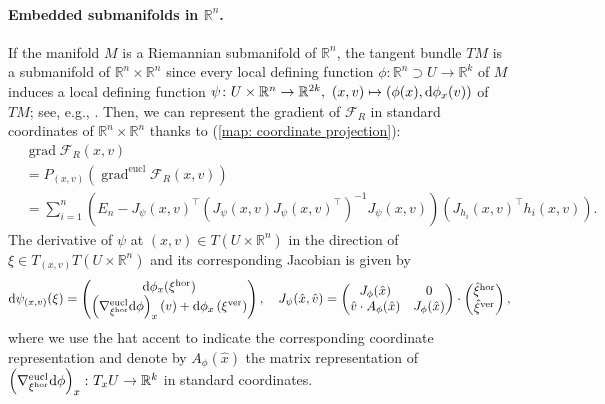 \documentclass[11pt,a4paper]{article}
\theoremstyle{plain}
\theoremstyle{definition}
\newcommand{\RR}{\mathbb{R}}
\DeclareMathOperator{\grad}{grad}
\newcommand{\hor}{\operatorname{hor}}
\newcommand{\ver}{\operatorname{ver}}
\newcommand{\eucl}{\operatorname{eucl}}
\begin{document}
\paragraph{Embedded submanifolds in $\RR^n$.}
If the manifold $M$ is a Riemannian submanifold of $\RR^n$, the tangent bundle $TM$ is a submanifold of $\RR^n\times \RR^n$ since every local defining function $\phi\colon \RR^n\supset U\to \RR^k$ of $M$ induces a local defining function $\psi\colon U\times\RR^n\to \RR^{2k},\ (x, v)\mapsto (\phi(x), \textup{d}\phi_x(v))$ of $TM$; see, e.g., \cite[Thm~3.43, p.~37-38]{boumal2023}.
Then, we can represent the gradient of $\mathcal{F}_R$  in standard coordinates of $\RR^n\times \RR^n$ thanks to (\ref{map: coordinate projection}):
\begin{align}
	&\grad \mathcal{F}_R(x, v)\nonumber\\
	&= P_{(x, v)}\left(\grad^{\eucl}\mathcal{F}_R(x, v)\right) \nonumber \\
	&= \sum\limits_{i=1}^n \left(E_n - J_{\psi}(x, v)^{\top}\left(J_{\psi}(x, v)J_{\psi}(x, v)^{\top}\right)^{-1}J_{\psi}(x, v)\right)\left(J_{h_i}(x, v)^{\top} h_i(x, v)\right).
	\label{eq: embedded gradient objective fct}
\end{align}
The derivative of $\psi$ at $(x, v)\in T(U\times\RR^n)$ in the direction of $\xi\in T_{(x, v)}T(U\times \RR^n)$ and its corresponding Jacobian is  given by
\begin{align*}
	\textup{d}\psi_{(x, v)}(\xi)
	= \begin{pmatrix}
		\textup{d}\phi_x(\xi^{\hor}) \\
		\left(\nabla^{\eucl}_{\xi^{\hor}} \textup{d}\phi\right)_x(v) + \textup{d}\phi_x\left(\xi^{\ver}\right)
	\end{pmatrix},
	\quad
	J_{\psi}(\hat{x}, \hat{v})
	= \begin{pmatrix}
		J_{\phi}(\hat{x}) & 0 \\
		\hat{v}\cdot A_{\phi}(\hat{x})& J_{\phi}(\hat{x})
	\end{pmatrix}
	\cdot \begin{pmatrix}
		\hat{\xi}^{\hor} \\
		\hat{\xi}^{\ver}	
	\end{pmatrix},
\end{align*}
where we use the hat accent to indicate the corresponding coordinate representation and denote by $A_{\phi}(\hat{x})$ the matrix representation of $\left(\nabla^{\eucl}_{\xi^{\hor}} \textup{d}\phi\right)_x\colon T_xU\to \RR^k$ in standard coordinates.
\end{document}
